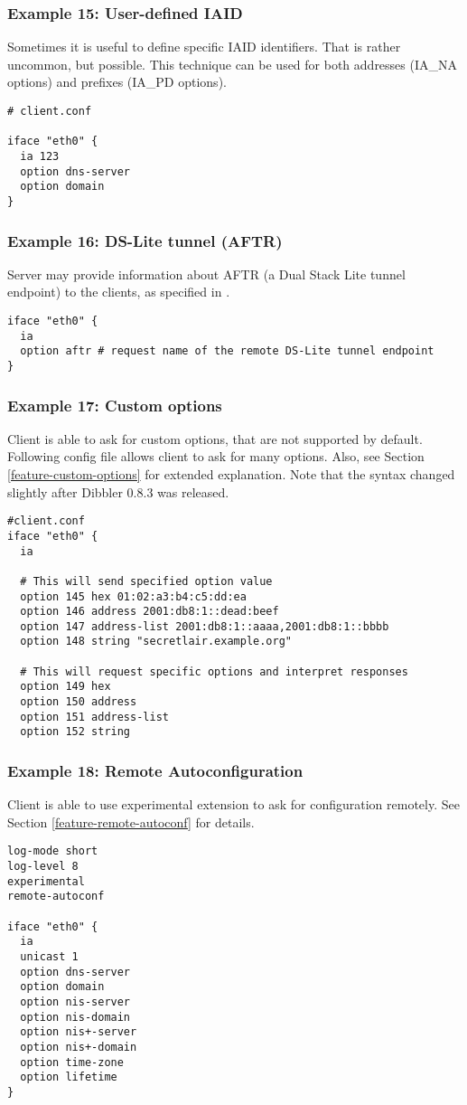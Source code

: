 \subsubsection{Example 15: User-defined IAID}
\label{example-client-iaid}
Sometimes it is useful to define specific IAID  identifiers. That is
rather uncommon, but possible. This technique can be used for both
addresses (IA\_NA options) and prefixes (IA\_PD options).

\begin{lstlisting}
# client.conf

iface "eth0" {
  ia 123
  option dns-server
  option domain
}
\end{lstlisting}

\subsubsection{Example 16: DS-Lite tunnel (AFTR)}
\label{example-server-ds-lite}
Server may provide information about AFTR (a Dual Stack Lite tunnel
endpoint) to the clients, as specified in \cite{rfc6334}.

\begin{lstlisting}
iface "eth0" {
  ia
  option aftr # request name of the remote DS-Lite tunnel endpoint
}
\end{lstlisting}

\subsubsection{Example 17: Custom options}
Client is able to ask for custom options, that are not supported by
default. Following config file allows client to ask for many
options. Also, see Section \ref{feature-custom-options} for
extended explanation. Note that the syntax changed slightly
after Dibbler 0.8.3 was released.

\begin{lstlisting}
#client.conf
iface "eth0" {
  ia

  # This will send specified option value  
  option 145 hex 01:02:a3:b4:c5:dd:ea
  option 146 address 2001:db8:1::dead:beef
  option 147 address-list 2001:db8:1::aaaa,2001:db8:1::bbbb
  option 148 string "secretlair.example.org"

  # This will request specific options and interpret responses
  option 149 hex
  option 150 address
  option 151 address-list
  option 152 string
\end{lstlisting}

\subsubsection{Example 18: Remote Autoconfiguration}
Client is able to use experimental extension to ask for configuration
remotely. See Section \ref{feature-remote-autoconf} for details.

\begin{lstlisting}
log-mode short
log-level 8
experimental
remote-autoconf

iface "eth0" {
  ia
  unicast 1
  option dns-server
  option domain
  option nis-server
  option nis-domain
  option nis+-server
  option nis+-domain
  option time-zone
  option lifetime
}
\end{lstlisting}
